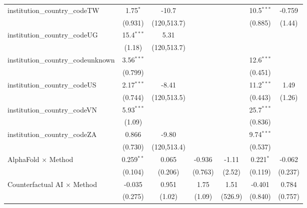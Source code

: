 \begin{tabular}{lcccccc}
   institution\_country\_codeTW          & 1.75$^{*}$     & -10.7         &               &            & 10.5$^{***}$  & -0.759\\   
                                         & (0.931)        & (120,513.7)   &               &            & (0.885)       & (1.44)\\   
   institution\_country\_codeUG          & 15.4$^{***}$   & 5.31          &               &            &               &   \\   
                                         & (1.18)         & (120,513.7)   &               &            &               &   \\   
   institution\_country\_codeunknown     & 3.56$^{***}$   &               &               &            & 12.6$^{***}$  &   \\   
                                         & (0.799)        &               &               &            & (0.451)       &   \\   
   institution\_country\_codeUS          & 2.17$^{***}$   & -8.41         &               &            & 11.2$^{***}$  & 1.49\\   
                                         & (0.744)        & (120,513.5)   &               &            & (0.443)       & (1.26)\\   
   institution\_country\_codeVN          & 5.93$^{***}$   &               &               &            & 25.7$^{***}$  &   \\   
                                         & (1.09)         &               &               &            & (0.836)       &   \\   
   institution\_country\_codeZA          & 0.866          & -9.80         &               &            & 9.74$^{***}$  &   \\   
                                         & (0.730)        & (120,513.4)   &               &            & (0.537)       &   \\   
   AlphaFold $\times$ Method             & 0.259$^{**}$   & 0.065         & -0.936        & -1.11      & 0.221$^{*}$   & -0.062\\   
                                         & (0.104)        & (0.206)       & (0.763)       & (2.52)     & (0.119)       & (0.237)\\   
   Counterfactual AI $\times$ Method     & -0.035         & 0.951         & 1.75          & 1.51       & -0.401        & 0.784\\   
                                         & (0.275)        & (1.02)        & (1.09)        & (526.9)    & (0.840)       & (0.757)\\   

\end{tabular}
